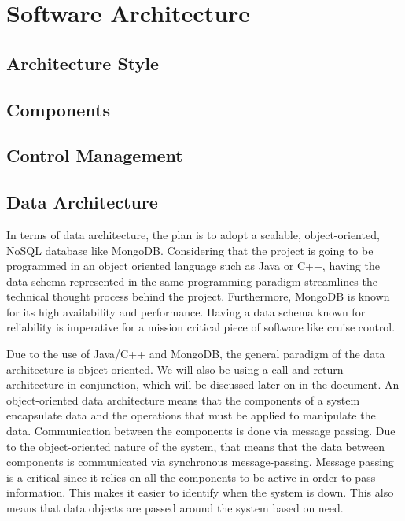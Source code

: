 \documentclass[preprint,11pt,3p]{article}
\begin{document}
\section{Software Architecture}

\subsection{Architecture Style} 
\subsection{Components} 
\subsection{Control Management} 
\subsection{Data Architecture} 
In terms of data architecture, the plan is to adopt a scalable, object-oriented, NoSQL database like MongoDB. Considering that the project is going to be programmed in an object oriented language such as Java or C++, having the data schema represented in the same programming paradigm streamlines the technical thought process behind the project. Furthermore, MongoDB is known for its high availability and performance. Having a data schema known for reliability is imperative for a mission critical piece of software like cruise control.\par
Due to the use of Java/C++ and MongoDB, the general paradigm of the data architecture is object-oriented. We will also be using a call and return architecture in conjunction, which will be discussed later on in the document.  An object-oriented data architecture means that the components of a system encapsulate data and the operations that must be applied to manipulate the data. Communication between the components is done via message passing. Due to the object-oriented nature of the system, that means that the data between components is communicated via synchronous message-passing. Message passing is a critical since it relies on all the components to be active in order to pass information. This makes it easier to identify when the system is down. This also means that data objects are passed around the system based on need. \par
\end{document}
